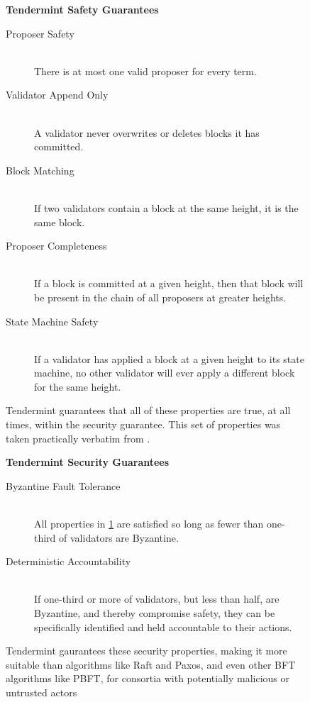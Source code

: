 \begin{figure}[]
	\textbf{Tendermint Safety Guarantees}
	\begin{description}
	  \item[Proposer Safety] \hfill \\
		There is at most one valid proposer for every term.
	  \item[Validator Append Only] \hfill \\
		A validator never overwrites or deletes blocks it has committed.
	  \item[Block Matching] \hfill \\
		If two validators contain a block at the same height, it is the same block.
	  \item[Proposer Completeness] \hfill \\
		If a block is committed at a given height, then that block will be present in the chain of all proposers at greater heights.
	  \item[State Machine Safety] \hfill \\
		If a validator has applied a block at a given height to its state machine, no other validator will ever apply a different block for the same height.
	\end{description}
  	\caption[Tendermint Safety Guarantees]{Tendermint guarantees that all of these properties are true, at all times, within the security guarantee. This set of properties was taken practically verbatim from \cite{raft_thesis}.}
	\label{fig:tendermint_gaurantees}
\end{figure}

\begin{figure}[]
	\textbf{Tendermint Security Guarantees}
	\begin{description}
	  \item[Byzantine Fault Tolerance] \hfill \\
		All properties in \ref{fig:tendermint_gaurantees} are satisfied so long as fewer than one-third of validators are Byzantine.
	  \item[Deterministic Accountability] \hfill \\
		If one-third or more of validators, but less than half, are Byzantine, and thereby compromise safety, 
		they can be specifically identified and held accountable to their actions.
	\end{description}
  	\caption[Tendermint Security Guarantees]{Tendermint gaurantees these security properties, making it more suitable than algorithms like Raft and Paxos, and even other BFT algorithms like PBFT, for consortia with potentially malicious or untrusted actors}
	\label{fig:tendermint_security}
\end{figure}


